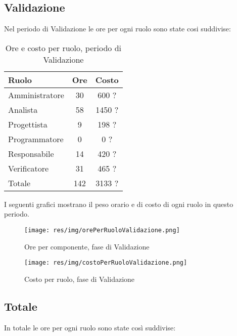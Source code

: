 \subsection{Validazione}
Nel periodo di Validazione le ore per ogni ruolo sono state cosi suddivise:

\begin{table}[H]
	\centering
	\begin{tabular}{ l c c }
		\textbf{Ruolo} & \textbf{Ore} & \textbf{Costo} \\
		\hline
		Amministratore & 30 & 600 ? \\
		Analista & 58 & 1450 ? \\
		Progettista & 9 & 198 ? \\
		Programmatore & 0 & 0 ? \\
		Responsabile & 14 & 420 ? \\
		Verificatore & 31 & 465 ? \\
		\hline
		Totale & 142 & 3133 ? \\
		\hline
	\end{tabular}
	\caption{Ore e costo per ruolo, periodo di Validazione}
\end{table}

I seguenti grafici mostrano il peso orario e di costo di ogni ruolo in questo periodo.

\begin{figure}[H]
  \begin{center}
    \texttt{[image: res/img/orePerRuoloValidazione.png]}
  \caption{Ore per componente, fase di Validazione}
  \end{center} 
\end{figure}  

\begin{figure}[H]
  \begin{center}
    \texttt{[image: res/img/costoPerRuoloValidazione.png]}
  \caption{Costo per ruolo, fase di Validazione}
  \end{center} 
\end{figure}  


\subsection{Totale}
In totale le ore per ogni ruolo sono state così suddivise:

